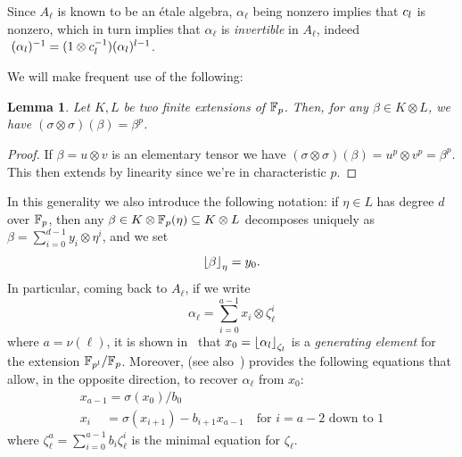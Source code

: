 \documentclass{sig-alternate}
\newtheorem{lemma}[theorem]{Lemma}
\begin{document}
Since $A_\ell$ is known to be an \'etale algebra, 
$\alpha_\ell$ being nonzero implies that $c_l$ is nonzero, which in turn implies
that $\alpha_\ell$ is \emph{invertible} in $A_\ell$, indeed $\;(\alpha_l)^{-1} = (1\otimes c_l^{-1})(\alpha_l)^{l-1}$.


We will make frequent use of the following:
\begin{lemma}
\label{FrobFrob}
Let $K,L$ be two finite extensions of $\mathbb{F}_{p}$.
Then, for any $\beta\in K\otimes L$,
we have $(\sigma\otimes\sigma)(\beta)=\beta^p$.
\end{lemma}
\begin{proof}
If $\beta=u\otimes v$ is an elementary tensor we have $(\sigma\otimes\sigma)(\beta)=u^p\otimes v^p=\beta^p$.
This then extends by linearity since we're in characteristic $p$. 
\end{proof}
In this generality we also introduce the following notation: if $\eta\in L$ has degree $d$ over $\mathbb{F}_{p}$,
then any $\beta\in K\otimes\mathbb{F}_{p}(\eta)\subseteq K\otimes L$ decomposes uniquely as $\beta = \sum_{i =  0}^{d-1}y_i\otimes\eta^i$,
and we set  \[ \left\lfloor \beta \right\rfloor_{\eta}=y_0. \]
In particular, coming back to $A_\ell$, if we write
\[ \alpha_\ell = \sum_{i=0}^{a-1}x_i\otimes\zeta_{\ell}^i \] where $a=\nu(\ell)$,
it is shown in~\cite{Allombert02} that $x_0=\left\lfloor \alpha_l \right\rfloor_{\zeta_l}$ is a \emph{generating element} for the extension
$\mathbb{F}_{p^l}/\mathbb{F}_{p}$.
Moreover, \cite{Allombert02} (see also~\cite{brieulle2018computing}) provides the following equations
that allow, in the opposite direction, to recover $\alpha_\ell$ from $x_0$:
\begin{equation}
\label{recoveralpha}
\begin{array}{l}
x_{a-1}=\sigma(x_0)/b_0\\
x_{i}\quad\,=\sigma(x_{i+1})-b_{i+1}x_{a-1}\quad\text{for $i=a\!-\!2$ down to $1$}
\end{array}
\end{equation}
where $\zeta_\ell^a=\sum_{i=0}^{a-1}b_i\zeta_\ell^i$ is the minimal equation for $\zeta_\ell$.
\end{document}

